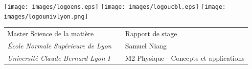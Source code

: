 \documentclass[11pt,a4paper]{article}
\begin{document}
\setlength{\parindent}{0pt}

\thispagestyle{empty}

\texttt{[image: images/logoens.eps]} \hfill \texttt{[image: images/logoucbl.eps]} \hfill \texttt{[image: images/logounivlyon.png]}

\vspace{1cm}

\begin{tabularx}{\textwidth}{@{} l X l @{} }
{\sc Master Science de la matière} & & Rapport de stage\\
{\it \'{E}cole Normale Supérieure de Lyon} & & Samuel Niang\\
{\it Université Claude Bernard Lyon I} & & M2 Physique - Concepts et applications

\end{tabularx}
\end{document}
